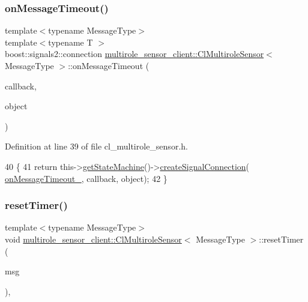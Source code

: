 \subsubsection{\texorpdfstring{on\+Message\+Timeout()}{onMessageTimeout()}}
{\footnotesize\ttfamily template$<$typename Message\+Type$>$ \\
template$<$typename T $>$ \\
boost\+::signals2\+::connection \hyperlink{classmultirole__sensor__client_1_1ClMultiroleSensor}{multirole\+\_\+sensor\+\_\+client\+::\+Cl\+Multirole\+Sensor}$<$ Message\+Type $>$\+::on\+Message\+Timeout (\begin{DoxyParamCaption}\item[{void(T\+::$\ast$)(const ros\+::\+Timer\+Event \&)}]{callback,  }\item[{T $\ast$}]{object }\end{DoxyParamCaption})\hspace{0.3cm}{\ttfamily [inline]}}



Definition at line 39 of file cl\+\_\+multirole\+\_\+sensor.\+h.


\begin{DoxyCode}
40   \{
41     \textcolor{keywordflow}{return} this->\hyperlink{classsmacc_1_1ISmaccClient_aec51d4712404cb9882b86e4c854bb93a}{getStateMachine}()->\hyperlink{classsmacc_1_1ISmaccStateMachine_adf0f42ade0c65cc471960fe2a7c42da2}{createSignalConnection}(
      \hyperlink{classmultirole__sensor__client_1_1ClMultiroleSensor_a1bc88382c36abae583a7c946cfe10ace}{onMessageTimeout\_}, callback, \textcolor{keywordtype}{object});
42   \}
\end{DoxyCode}
\mbox{\label{classmultirole__sensor__client_1_1ClMultiroleSensor_a84b63ad1c68a8027773fa450fcce8234}} 
\subsubsection{\texorpdfstring{reset\+Timer()}{resetTimer()}}
{\footnotesize\ttfamily template$<$typename Message\+Type$>$ \\
void \hyperlink{classmultirole__sensor__client_1_1ClMultiroleSensor}{multirole\+\_\+sensor\+\_\+client\+::\+Cl\+Multirole\+Sensor}$<$ Message\+Type $>$\+::reset\+Timer (\begin{DoxyParamCaption}\item[{const Message\+Type \&}]{msg }\end{DoxyParamCaption})\hspace{0.3cm}{\ttfamily [inline]}, {\ttfamily [protected]}}



